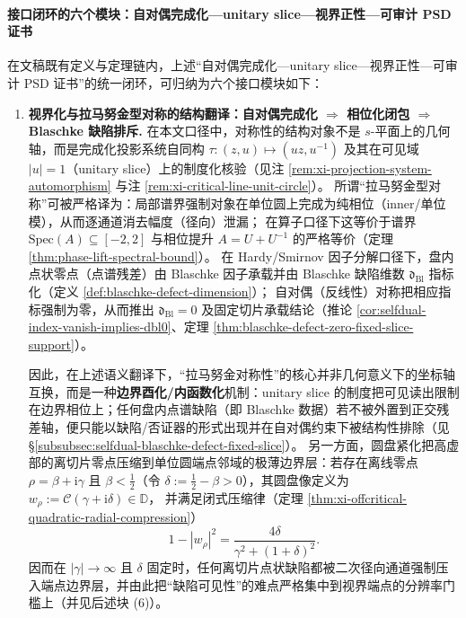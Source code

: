 \paragraph{接口闭环的六个模块：自对偶完成化—unitary slice—视界正性—可审计 PSD 证书}
在文稿既有定义与定理链内，上述“自对偶完成化—unitary slice—视界正性—可审计 PSD 证书”的统一闭环，可归纳为六个接口模块如下：
\begin{enumerate}
  \item \textbf{视界化与拉马努金型对称的结构翻译：自对偶完成化 \(\Rightarrow\) 相位化闭包 \(\Rightarrow\) Blaschke 缺陷排斥.}
  在本文口径中，对称性的结构对象不是 \(s\)-平面上的几何轴，而是完成化投影系统自同构
  \(\tau:(z,u)\mapsto(uz,u^{-1})\) 及其在可见域 \(|u|=1\)（unitary slice）上的制度化核验（见注 \ref{rem:xi-projection-system-automorphism} 与注 \ref{rem:xi-critical-line-unit-circle}）。
  所谓“拉马努金型对称”可被严格译为：局部谱界强制对象在单位圆上完成为纯相位（inner/单位模），从而逐通道消去幅度（径向）泄漏；
  在算子口径下这等价于谱界 \(\mathrm{Spec}(A)\subseteq[-2,2]\) 与相位提升 \(A=U+U^{-1}\) 的严格等价（定理 \ref{thm:phase-lift-spectral-bound}）。
  在 Hardy/Smirnov 因子分解口径下，盘内点状零点（点谱残差）由 Blaschke 因子承载并由 Blaschke 缺陷维数 \(\mathfrak d_{\mathrm{Bl}}\) 指标化（定义 \ref{def:blaschke-defect-dimension}）；
  自对偶（反线性）对称把相应指标强制为零，从而推出 \(\mathfrak d_{\mathrm{Bl}}=0\) 及固定切片承载结论（推论 \ref{cor:selfdual-index-vanish-implies-dbl0}、定理 \ref{thm:blaschke-defect-zero-fixed-slice-support}）。
  \par
  因此，在上述语义翻译下，“拉马努金对称性”的核心并非几何意义下的坐标轴互换，而是一种\textbf{边界酉化/内函数化}机制：unitary slice 的制度把可见读出限制在边界相位上；任何盘内点谱缺陷（即 Blaschke 数据）若不被外置到正交残差轴，便只能以缺陷/否证器的形式出现并在自对偶约束下被结构性排除（见 \S\ref{subsubsec:selfdual-blaschke-defect-fixed-slice}）。
  另一方面，圆盘紧化把高虚部的离切片零点压缩到单位圆端点邻域的极薄边界层：若存在离线零点 \(\rho=\beta+\mathrm{i}\gamma\) 且 \(\beta<\tfrac12\)（令 \(\delta:=\tfrac12-\beta>0\)），其圆盘像定义为
  \(
  w_\rho:=\mathcal{C}(\gamma+\mathrm{i}\delta)\in\mathbb{D}
  \)，
  并满足闭式压缩律（定理 \ref{thm:xi-offcritical-quadratic-radial-compression}）
  \[
    1-|w_\rho|^2=\frac{4\delta}{\gamma^2+(1+\delta)^2}.
  \]
  因而在 \(|\gamma|\to\infty\) 且 \(\delta\) 固定时，任何离切片点状缺陷都被二次径向通道强制压入端点边界层，并由此把“缺陷可见性”的难点严格集中到视界端点的分辨率门槛上（并见后述块 (6)）。


\end{enumerate}

